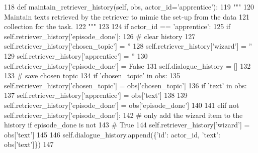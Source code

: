 \begin{DoxyCode}
118     \textcolor{keyword}{def }maintain\_retriever\_history(self, obs, actor\_id='apprentice'):
119         \textcolor{stringliteral}{"""}
120 \textcolor{stringliteral}{        Maintain texts retrieved by the retriever to mimic the set-up from the data}
121 \textcolor{stringliteral}{        collection for the task.}
122 \textcolor{stringliteral}{        """}
123 
124         \textcolor{keywordflow}{if} actor\_id == \textcolor{stringliteral}{'apprentice'}:
125             \textcolor{keywordflow}{if} self.retriever\_history[\textcolor{stringliteral}{'episode\_done'}]:
126                 \textcolor{comment}{# clear history}
127                 self.retriever\_history[\textcolor{stringliteral}{'chosen\_topic'}] = \textcolor{stringliteral}{''}
128                 self.retriever\_history[\textcolor{stringliteral}{'wizard'}] = \textcolor{stringliteral}{''}
129                 self.retriever\_history[\textcolor{stringliteral}{'apprentice'}] = \textcolor{stringliteral}{''}
130                 self.retriever\_history[\textcolor{stringliteral}{'episode\_done'}] = \textcolor{keyword}{False}
131                 self.dialogue\_history = []
132 
133             \textcolor{comment}{# save chosen topic}
134             \textcolor{keywordflow}{if} \textcolor{stringliteral}{'chosen\_topic'} \textcolor{keywordflow}{in} obs:
135                 self.retriever\_history[\textcolor{stringliteral}{'chosen\_topic'}] = obs[\textcolor{stringliteral}{'chosen\_topic'}]
136             \textcolor{keywordflow}{if} \textcolor{stringliteral}{'text'} \textcolor{keywordflow}{in} obs:
137                 self.retriever\_history[\textcolor{stringliteral}{'apprentice'}] = obs[\textcolor{stringliteral}{'text'}]
138 
139             self.retriever\_history[\textcolor{stringliteral}{'episode\_done'}] = obs[\textcolor{stringliteral}{'episode\_done'}]
140 
141         \textcolor{keywordflow}{elif} \textcolor{keywordflow}{not} self.retriever\_history[\textcolor{stringliteral}{'episode\_done'}]:
142             \textcolor{comment}{# only add the wizard item to the history if episode\_done is not}
143             \textcolor{comment}{# True}
144             self.retriever\_history[\textcolor{stringliteral}{'wizard'}] = obs[\textcolor{stringliteral}{'text'}]
145 
146         self.dialogue\_history.append(\{\textcolor{stringliteral}{'id'}: actor\_id, \textcolor{stringliteral}{'text'}: obs[\textcolor{stringliteral}{'text'}]\})
147 
\end{DoxyCode}
\mbox{\label{classprojects_1_1wizard__of__wikipedia_1_1knowledge__retriever_1_1knowledge__retriever_1_1KnowledgeRetrieverAgent_a5116c18367cb3b8067ae2db42cce9773}} 
